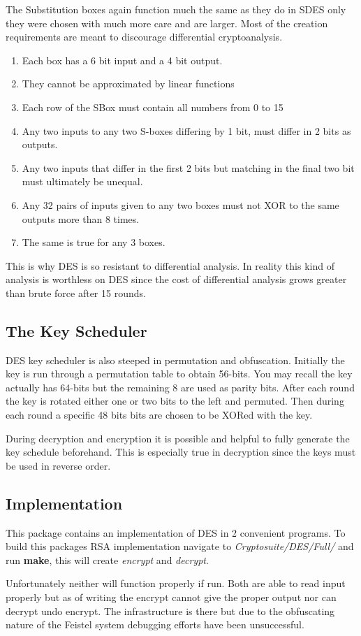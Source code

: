 The Substitution boxes again function much the same as they do in SDES only they were chosen with much more care and are larger.
Most of the creation requirements are meant to discourage differential cryptoanalysis.

\begin{enumerate}
\item Each box has a 6 bit input and a 4 bit output.
\item They cannot be approximated by linear functions
\item Each row of the SBox must contain all numbers from 0 to 15
\item Any two inputs to any two S-boxes differing by 1 bit, must differ in 2 bits as outputs.
\item Any two inputs that differ in the first 2 bits but matching in the final two bit must ultimately be unequal.
\item Any 32 pairs of inputs given to any two boxes must not XOR to the same outputs more than 8 times.
\item The same is true for any 3 boxes.
\end{enumerate}

This is why DES is so resistant to differential analysis. 
In reality this kind of analysis is worthless on DES since the cost of differential analysis grows greater than brute force after 15 rounds.

\subsection{The Key Scheduler}

DES key scheduler is also steeped in permutation and obfuscation.
Initially the key is run through a permutation table to obtain 56-bits. 
You may recall the key actually has 64-bits but the remaining 8 are used as parity bits.
After each round the key is rotated either one or two bits to the left and permuted.
Then during each round a specific 48 bits bits are chosen to be XORed with the key.

During decryption and encryption it is possible and helpful to fully generate the key schedule beforehand.
This is especially true in decryption since the keys must be used in reverse order.


\subsection{Implementation}

This package contains an implementation of DES in 2 convenient programs.
To build this packages RSA implementation navigate to \textit{Cryptosuite/DES/Full/} and run \textbf{make}, this will create \textit{ encrypt} and \textit{decrypt}.

Unfortunately neither will function properly if run. 
Both are able to read input properly but as of writing the encrypt cannot give the proper output nor can decrypt undo encrypt.
The infrastructure is there but due to the obfuscating nature of the Feistel system debugging efforts have been unsuccessful.
